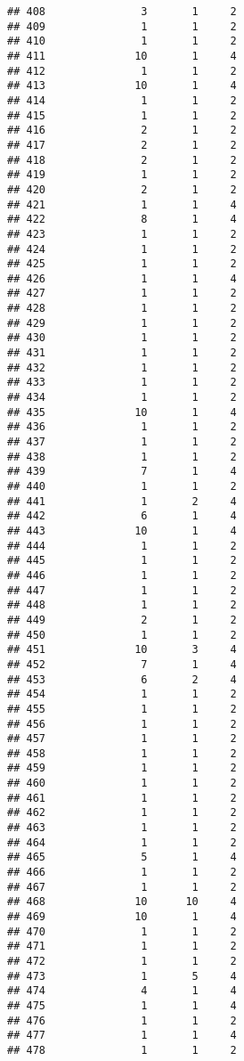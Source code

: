 \documentclass[
]{article}
\begin{document}
\begin{verbatim}
## 408               3       1     2
## 409               1       1     2
## 410               1       1     2
## 411              10       1     4
## 412               1       1     2
## 413              10       1     4
## 414               1       1     2
## 415               1       1     2
## 416               2       1     2
## 417               2       1     2
## 418               2       1     2
## 419               1       1     2
## 420               2       1     2
## 421               1       1     4
## 422               8       1     4
## 423               1       1     2
## 424               1       1     2
## 425               1       1     2
## 426               1       1     4
## 427               1       1     2
## 428               1       1     2
## 429               1       1     2
## 430               1       1     2
## 431               1       1     2
## 432               1       1     2
## 433               1       1     2
## 434               1       1     2
## 435              10       1     4
## 436               1       1     2
## 437               1       1     2
## 438               1       1     2
## 439               7       1     4
## 440               1       1     2
## 441               1       2     4
## 442               6       1     4
## 443              10       1     4
## 444               1       1     2
## 445               1       1     2
## 446               1       1     2
## 447               1       1     2
## 448               1       1     2
## 449               2       1     2
## 450               1       1     2
## 451              10       3     4
## 452               7       1     4
## 453               6       2     4
## 454               1       1     2
## 455               1       1     2
## 456               1       1     2
## 457               1       1     2
## 458               1       1     2
## 459               1       1     2
## 460               1       1     2
## 461               1       1     2
## 462               1       1     2
## 463               1       1     2
## 464               1       1     2
## 465               5       1     4
## 466               1       1     2
## 467               1       1     2
## 468              10      10     4
## 469              10       1     4
## 470               1       1     2
## 471               1       1     2
## 472               1       1     2
## 473               1       5     4
## 474               4       1     4
## 475               1       1     4
## 476               1       1     2
## 477               1       1     4
## 478               1       1     2

\end{verbatim}
\end{document}
